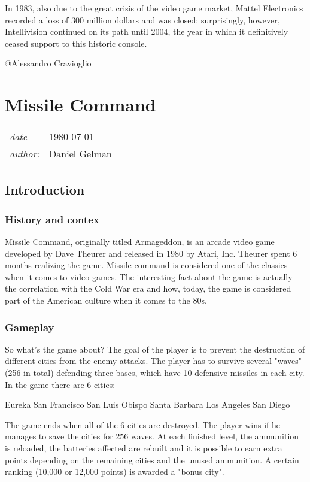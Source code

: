 \documentclass[a4paper,10pt]{book}
\newcommand{\pageHeader}[4]{
    \section{#1}
    \vspace{-0.3cm}
    \begin{table}[h!]
     \begin{tabular}{ll}
        \hline
        \textit{date} & #2 \\
        \textit{author: } & #3\\
        \hline
     \end{tabular}
    \end{table}
    \vspace{-0.3cm}
}
\begin{document}
        In 1983, also due to the great crisis of the video game market, Mattel Electronics recorded a loss of 300 million
        dollars and was closed; surprisingly, however, Intellivision continued on its path until 2004, the year in which
        it definitively ceased support to this historic console. 
 
 @Alessandro Cravioglio 
 
 \newpage\pageHeader{Missile Command}{1980-07-01}{Daniel Gelman}{Missile Command is an arcade Video Game released in 1980, not just a game, a piece of history. Come in ! Find out why.}
 \subsection{Introduction }
 \subsubsection{History and contex }
   \textbf{}   \textit{}
 
                Missile Command, originally titled Armageddon, is an arcade video game developed by Dave Theurer and released in 1980 by Atari, Inc.   Theurer spent 6 months realizing the game. Missile command is considered one of the classics when
                it comes to video games. The interesting fact about the game is actually the correlation with the Cold War era and how, today, the game is considered part of the American culture when it comes to the 80s.
             
 \subsubsection{Gameplay }
   \textbf{}   \textit{}
 
                So what's the game about?   The goal of the player is to prevent the destruction of different cities from the enemy attacks. The player has to survive several "waves" (256 in total) defending three bases, which have 10 defensive missiles
                in each city. In the game there are 6 cities:
                 
 Eureka 
 San Francisco 
 San Luis Obispo 
 Santa Barbara 
 Los Angeles 
 San Diego 
 
                The game ends when all of the 6 cities are destroyed. The player wins if he manages to save the cities for 256 waves. At each finished level, the ammunition is reloaded, the batteries affected are rebuilt and it is possible to earn extra points depending
                on the remaining cities and the unused ammunition. A certain ranking (10,000 or 12,000 points) is awarded a "bonus city".
             
\end{document}

